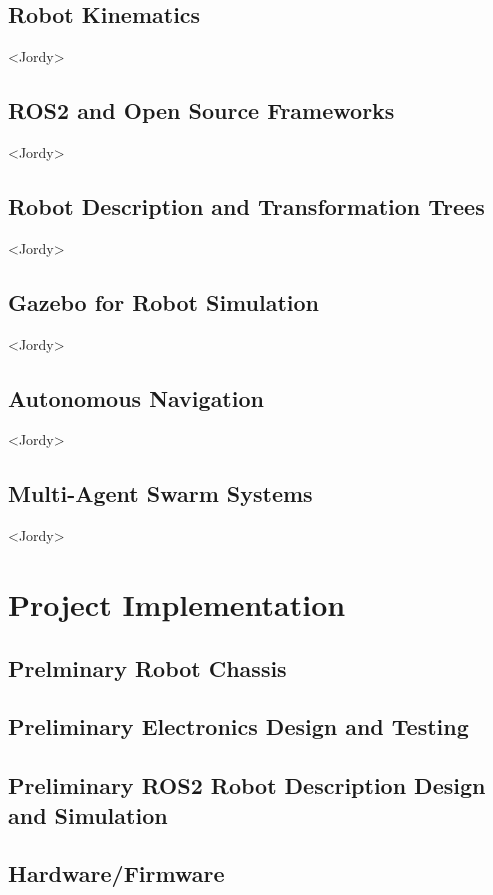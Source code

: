 \documentclass[conference]{IEEEtran}
\begin{document}
\subsection{Robot Kinematics} <Jordy>

\subsection{ROS2 and Open Source Frameworks} <Jordy>

\subsection{Robot Description and Transformation Trees} <Jordy>

\subsection{Gazebo for Robot Simulation} <Jordy>

\subsection{Autonomous Navigation} <Jordy>

\subsection{Multi-Agent Swarm Systems} <Jordy>

\section{Project Implementation}
\subsection{Prelminary Robot Chassis}

\subsection{Preliminary Electronics Design and Testing}

\subsection{Preliminary ROS2 Robot Description Design and Simulation}

\subsection{Hardware/Firmware}
\end{document}
